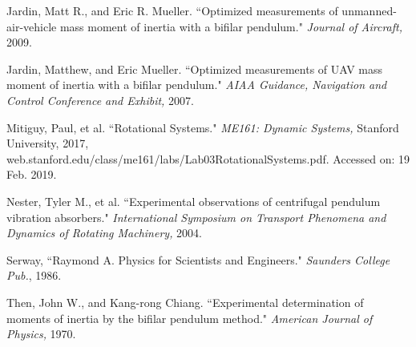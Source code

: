 \documentclass[a4paper,12pt]{article}
\theoremstyle{definition}
\begin{document}
\begin{flushleft}
\sloppy
Jardin, Matt R., and Eric R. Mueller. ``Optimized measurements of unmanned-air-vehicle mass moment of inertia with a bifilar pendulum." \textit{Journal of Aircraft,} 2009.

Jardin, Matthew, and Eric Mueller. ``Optimized measurements of UAV mass moment of inertia with a bifilar pendulum." \textit{AIAA Guidance, Navigation and Control Conference and Exhibit,} 2007.

Mitiguy, Paul, et al. ``Rotational Systems." \textit{ME161: Dynamic Systems,} Stanford University, 2017, web.stanford.edu/class/me161/labs/Lab03RotationalSystems.pdf. Accessed on: 19 Feb. 2019.

Nester, Tyler M., et al. ``Experimental observations of centrifugal pendulum vibration absorbers." \textit{International Symposium on Transport Phenomena and Dynamics of Rotating Machinery,} 2004.



Serway, ``Raymond A. Physics for Scientists and Engineers." \textit{Saunders College Pub.}, 1986.

Then, John W., and Kang-rong Chiang. ``Experimental determination of moments of inertia by the bifilar pendulum method." \textit{American Journal of Physics,} 1970.


\end{flushleft}
\end{document}

